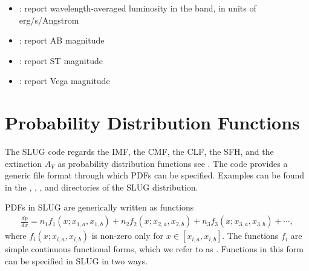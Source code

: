 \documentclass[letterpaper,10pt,english]{sphinxmanual}
\begin{document}
\begin{itemize}
\begin{description}
\begin{itemize}
\item {} 
: report wavelength-averaged luminosity in the band, in units of erg/s/Angstrom

\item {} 
: report AB magnitude

\item {} 
: report ST magnitude

\item {} 
: report Vega magnitude

\end{itemize}

\end{description}

\end{itemize}


\chapter{Probability Distribution Functions}
\label{\detokenize{pdfs:probability-distribution-functions}}\label{\detokenize{pdfs::doc}}\label{\detokenize{pdfs:sec-pdfs}}
The SLUG code regards the IMF, the CMF, the CLF, the SFH, and the extinction \(A_V\) as probability distribution functions \textendash{} see {\hyperref[\detokenize{intro:ssec-slugpdfs}]{}}. The code provides a generic file format through which PDFs can be specified. Examples can be found in the , , , and  directories of the SLUG distribution.

PDFs in SLUG are generically written as functions
\begin{equation*}
\begin{split}\frac{dp}{dx} = n_1 f_1(x; x_{1,a}, x_{1,b}) + n_2 f_2(x; x_{2,a}, x_{2,b}) + n_3 f_3(x; x_{3,a}, x_{3,b}) + \cdots,\end{split}
\end{equation*}
where \(f_i(x; x_{i,a}, x_{i,b})\) is non-zero only for \(x \in [x_{i,a}, x_{i,b}]\). The functions \(f_i\) are simple continuous functional forms, which we refer to as . Functions in this form can be specified in SLUG in two ways.
\end{document}
